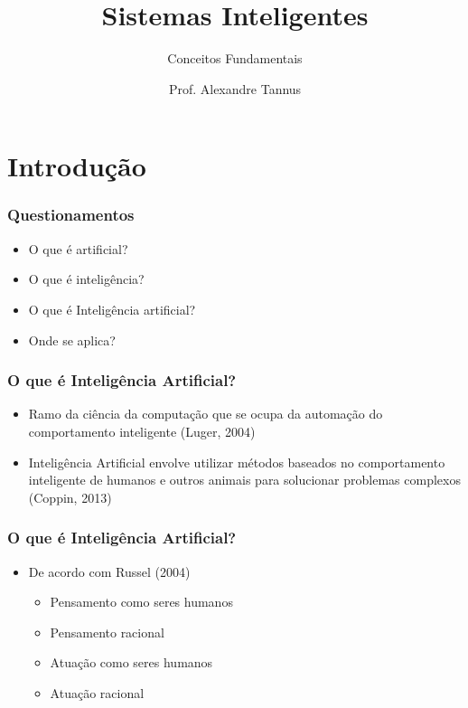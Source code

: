 \documentclass[aspectratio=169]{beamer}
\title[]{Sistemas Inteligentes}
\subtitle[]{Conceitos Fundamentais}
\author[]{Prof. Alexandre Tannus}
\date{}
\begin{document}
	\begin{frame}
		\titlepage
	\end{frame}

	\begin{frame}
		\tableofcontents		
	\end{frame}	
	
	\section{Introdução}
	
	\begin{frame}
		\frametitle{Questionamentos}
		\begin{itemize}
			\item O que é artificial? 

			\item O que é inteligência?

			\item O que é Inteligência artificial?

			\item Onde se aplica?

		\end{itemize}
	\end{frame}
	
	\begin{frame}
		\frametitle{O que é Inteligência Artificial?}
		\begin{itemize}
			\item Ramo da ciência da computação que se ocupa da automação do comportamento inteligente (Luger, 2004)

			\item Inteligência Artificial envolve utilizar métodos baseados no comportamento inteligente de humanos e outros animais para solucionar problemas complexos (Coppin, 2013)

		\end{itemize}
	\end{frame}	
	
	\begin{frame}
		\frametitle{O que é Inteligência Artificial?}
		\begin{itemize}
			\item De acordo com Russel (2004)
			\begin{itemize}
				\item Pensamento como seres humanos
				\item Pensamento racional
				\item Atuação como seres humanos
				\item Atuação racional				
			\end{itemize}
		\end{itemize}	
	\end{frame}
	
\end{document}
